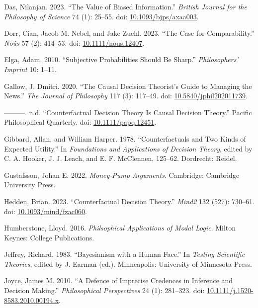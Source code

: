 \documentclass[
  10pt,
  letterpaper,
  DIV=11,
  numbers=noendperiod,
  twoside]{scrartcl}
\newlength{\cslhangindent}
\newenvironment{CSLReferences}[2] %
 {\begin{list}{}{%
  \setlength{\itemindent}{0pt}
  \setlength{\leftmargin}{0pt}
  \setlength{\parsep}{0pt}
  \ifodd #1
   \setlength{\leftmargin}{\cslhangindent}
   \setlength{\itemindent}{-1\cslhangindent}
  \fi
  \setlength{\itemsep}{#2\baselineskip}}}
 {\end{list}}
\begin{document}
\begin{CSLReferences}{1}{0}
Das, Nilanjan. 2023. {``The Value of Biased Information.''}
\emph{British Journal for the Philosophy of Science} 74 (1): 25--55.
doi: \href{https://doi.org/10.1093/bjps/axaa003}{10.1093/bjps/axaa003}.

Dorr, Cian, Jacob M. Nebel, and Jake Zuehl. 2023. {``The Case for
Comparability.''} \emph{Noûs} 57 (2): 414--53. doi:
\href{https://doi.org/10.1111/nous.12407}{10.1111/nous.12407}.

Elga, Adam. 2010. {``Subjective Probabilities Should Be Sharp.''}
\emph{Philosophers' Imprint} 10: 1--11.

Gallow, J. Dmitri. 2020. {``The Causal Decision Theorist's Guide to
Managing the News.''} \emph{The Journal of Philosophy} 117 (3): 117--49.
doi:
\href{https://doi.org/10.5840/jphil202011739}{10.5840/jphil202011739}.

---------. n.d. {``Counterfactual Decision Theory Is Causal Decision
Theory.''} Pacific Philosophical Quarterly. doi:
\href{https://doi.org/10.1111/papq.12451}{10.1111/papq.12451}.

Gibbard, Allan, and William Harper. 1978. {``Counterfactuals and Two
Kinds of Expected Utility.''} In \emph{Foundations and Applications of
Decision Theory}, edited by C. A. Hooker, J. J. Leach, and E. F.
McClennen, 125--62. Dordrecht: Reidel.

Gustafsson, Johan E. 2022. \emph{Money-Pump Arguments}. Cambridge:
Cambridge University Press.

Hedden, Brian. 2023. {``Counterfactual Decision Theory.''} \emph{Mind2}
132 (527): 730--61. doi:
\href{https://doi.org/10.1093/mind/fzac060}{10.1093/mind/fzac060}.

Humberstone, Lloyd. 2016. \emph{Philsophical Applications of Modal
Logic}. Milton Keynes: College Publications.

Jeffrey, Richard. 1983. {``Bayesianism with a Human Face.''} In
\emph{Testing Scientific Theories}, edited by J. Earman (ed.).
Minneapolis: University of Minnesota Press.

Joyce, James M. 2010. {``A Defence of Imprecise Credences in Inference
and Decision Making.''} \emph{Philosophical Perspectives} 24 (1):
281--323. doi:
\href{https://doi.org/10.1111/j.1520-8583.2010.00194.x}{10.1111/j.1520-8583.2010.00194.x}.


\end{CSLReferences}
\end{document}
